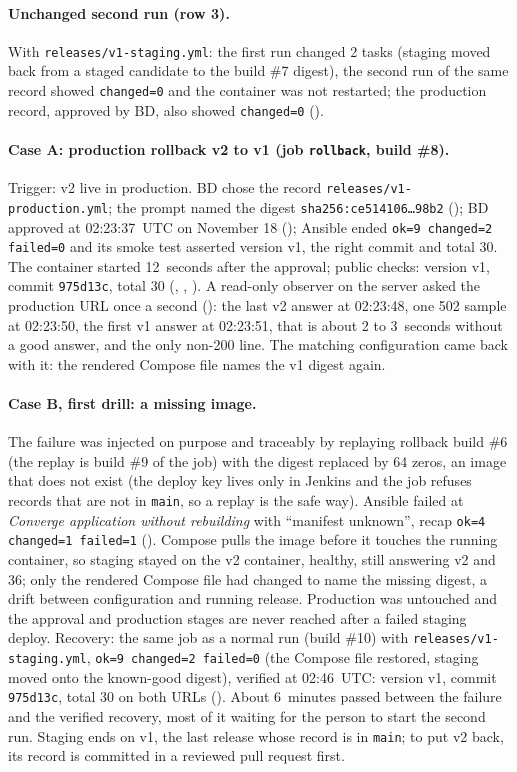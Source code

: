 \paragraph{Unchanged second run (row 3).} With \texttt{releases/v1-staging.yml}: the first run changed 2 tasks (staging moved back from a staged candidate to the build \#7 digest), the second run of the same record showed \texttt{changed=0} and the container was not restarted; the production record, approved by BD, also showed \texttt{changed=0}
().

\paragraph{Case A: production rollback v2 to v1 (job \texttt{rollback}, build \#8).} Trigger: v2 live in production. BD chose the record \texttt{releases/v1-production.yml}; the prompt named the digest \texttt{sha256:ce514106\ldots 98b2} (); BD approved at 02:23:37~UTC on November 18 ();
Ansible ended \texttt{ok=9 changed=2 failed=0} and its smoke test asserted version v1, the right commit and total 30. The container started 12~seconds after the approval; public checks: version v1, commit \texttt{975d13c}, total 30 (, , ).
A read-only observer on the server asked the production URL once a second (): the last v2 answer at 02:23:48, one 502 sample at 02:23:50, the first v1 answer at 02:23:51, that is about 2 to 3~seconds without a good answer, and the only non-200 line. The matching configuration came back with it: the rendered Compose file names the v1 digest again.

\paragraph{Case B, first drill: a missing image.} The failure was injected on purpose and traceably by replaying rollback build \#6 (the replay is build \#9 of the job) with the digest replaced by 64 zeros, an image that does not exist (the deploy key lives only in Jenkins and the job refuses records that are not in \texttt{main}, so a replay is the safe way).
Ansible failed at \emph{Converge application without rebuilding} with ``manifest unknown'', recap \texttt{ok=4 changed=1 failed=1} (). Compose pulls the image before it touches the running container, so staging stayed on the v2 container, healthy, still answering v2 and 36; only the rendered Compose file had changed to name the missing digest, a drift between configuration and running release.
Production was untouched and the approval and production stages are never reached after a failed staging deploy. Recovery: the same job as a normal run (build \#10) with \texttt{releases/v1-staging.yml}, \texttt{ok=9 changed=2 failed=0} (the Compose file restored, staging moved onto the known-good digest), verified at 02:46~UTC: version v1, commit \texttt{975d13c}, total 30 on both URLs ().
About 6~minutes passed between the failure and the verified recovery, most of it waiting for the person to start the second run. Staging ends on v1, the last release whose record is in \texttt{main}; to put v2 back, its record is committed in a reviewed pull request first.

